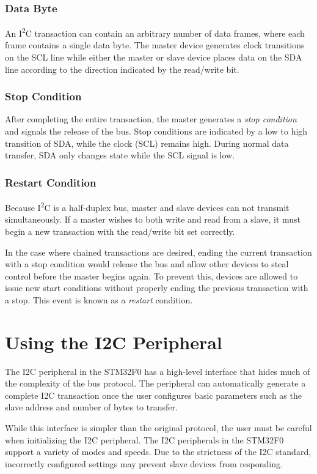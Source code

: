 \documentclass[11pt,fleqn]{book} %
\begin{document}
        \subsubsection{Data Byte}
        An I\textsuperscript{2}C transaction can contain an arbitrary number of data frames, where each frame contains a single data byte. The master device generates clock transitions on the SCL line while either the master or slave device places data on the SDA line according to the direction indicated by the read/write bit. 
        \subsubsection{Stop Condition}
        After completing the entire transaction, the master generates a \textit{stop condition} and signals the release of the bus. Stop conditions are indicated by a low to high transition of SDA, while the clock (SCL) remains high. During normal data transfer, SDA only changes state while the SCL signal is low. 
        \subsubsection{Restart Condition}
        Because I\textsuperscript{2}C is a half-duplex bus, master and slave devices can not transmit simultaneously. If a master wishes to both write and read from a slave, it must begin a new transaction with the read/write bit set correctly. 
        
        In the case where chained transactions are desired, ending the current transaction with a stop condition would release the bus and allow other devices to steal control before the master begins again. To prevent this, devices are allowed to issue new start conditions without properly ending the previous transaction with a stop. This event is known as a \textit{restart} condition. 

\section{Using the I2C Peripheral}
    The I2C peripheral in the STM32F0 has a high-level interface that hides much of the complexity of the bus protocol. The peripheral can automatically generate a complete I2C transaction once the user configures basic parameters such as the slave address and number of bytes to transfer. 
    
    While this interface is simpler than the original protocol, the user must be careful when initializing the I2C peripheral. The I2C peripherals in the STM32F0 support a variety of modes and speeds. Due to the strictness of the I2C standard, incorrectly configured settings may prevent slave devices from responding.
\end{document}
